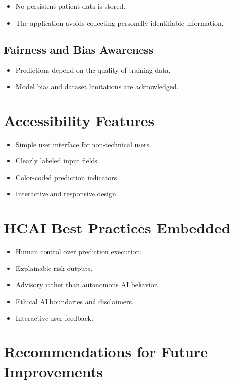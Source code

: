 \documentclass[12pt]{article}
\begin{document}
\begin{itemize}
    \item No persistent patient data is stored.
    \item The application avoids collecting personally identifiable information.
\end{itemize}

\subsection*{Fairness and Bias Awareness}

\begin{itemize}
    \item Predictions depend on the quality of training data.
    \item Model bias and dataset limitations are acknowledged.
\end{itemize}

\section*{Accessibility Features}

\begin{itemize}
    \item Simple user interface for non-technical users.
    \item Clearly labeled input fields.
    \item Color-coded prediction indicators.
    \item Interactive and responsive design.
\end{itemize}

\section*{HCAI Best Practices Embedded}

\begin{itemize}
    \item Human control over prediction execution.
    \item Explainable risk outputs.
    \item Advisory rather than autonomous AI behavior.
    \item Ethical AI boundaries and disclaimers.
    \item Interactive user feedback.
\end{itemize}

\section*{Recommendations for Future Improvements}
\end{document}
